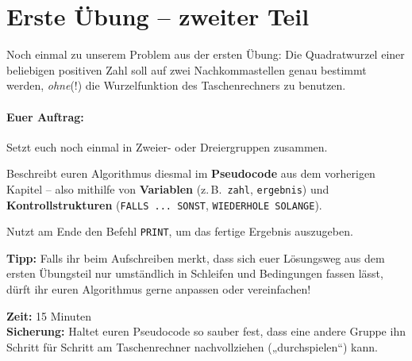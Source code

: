 \clearpage

\rehead[]{\textcolor{lightblue}{AvHG, Inf, My}}
\lohead[]{\textcolor{lightblue}{AvHG, Inf, My}}

\section{Erste Übung -- zweiter Teil}

Noch einmal zu unserem Problem aus der ersten Übung: Die Quadratwurzel einer
beliebigen positiven Zahl soll auf zwei Nachkommastellen genau bestimmt werden,
\emph{ohne}(!) die Wurzelfunktion des Taschenrechners zu benutzen.

\paragraph{Euer Auftrag:}
\begin{compactenum}[1.]
\item Setzt euch noch einmal in Zweier- oder Dreiergruppen zusammen.
\item Beschreibt euren Algorithmus diesmal im \textbf{Pseudocode} aus dem
vorherigen Kapitel -- also mithilfe von \textbf{Variablen} (z.\,B.\
\lstinline|zahl|, \lstinline|ergebnis|) und \textbf{Kontrollstrukturen}
(\lstinline|FALLS ... SONST|, \lstinline|WIEDERHOLE SOLANGE|).
\item Nutzt am Ende den Befehl \lstinline|PRINT|, um das fertige Ergebnis
auszugeben.
\end{compactenum}

\medskip
\noindent \textbf{Tipp:} Falls ihr beim Aufschreiben merkt, dass sich euer
Lösungsweg aus dem ersten Übungsteil nur umständlich in Schleifen und
Bedingungen fassen lässt, dürft ihr euren Algorithmus gerne anpassen oder
vereinfachen!

\medskip
\noindent \textbf{Zeit:} 15 Minuten \\
\textbf{Sicherung:} Haltet euren Pseudocode so sauber fest, dass eine andere
Gruppe ihn Schritt für Schritt am Taschenrechner nachvollziehen („durchspielen“)
kann.
